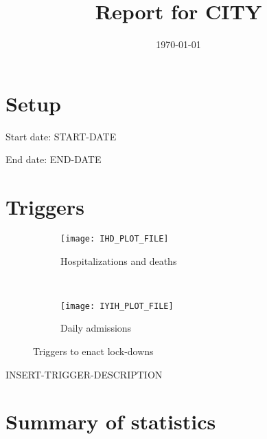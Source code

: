 \documentclass{article}
\title{Report for CITY}
\author{}
\date{\today}
\begin{document}
\maketitle

\section*{Setup}

Start date: START-DATE

End date: END-DATE 




\section*{Triggers}
\begin{figure}[!htb]
  \centering
  \setlength{\unitlength}{1cm}
    \begin{subfigure}[b]{0.475\linewidth}
    \centering
        \texttt{[image: IHD\_PLOT\_FILE]}
        \caption{Hospitalizations  and deaths}
        \label{fig:IHD}
    \end{subfigure}
    ~
    \begin{subfigure}[b]{0.475\linewidth}
    \centering
         \texttt{[image: IYIH\_PLOT\_FILE]}
        \caption{Daily admissions}
        \label{fig:IYIH}
    \end{subfigure}
    \caption{Triggers to enact lock-downs}\label{fig:SD90}
\end{figure}

INSERT-TRIGGER-DESCRIPTION

\newpage

\section*{Summary of statistics}
\end{document}

